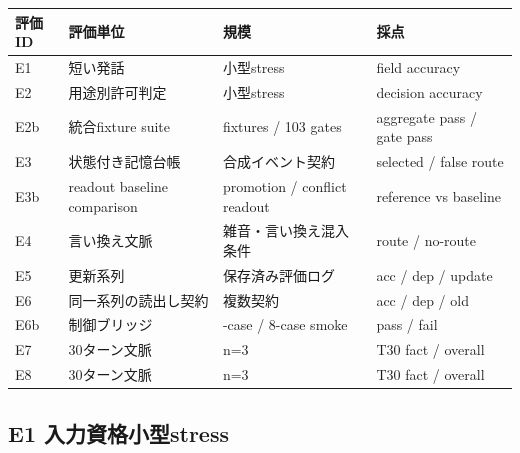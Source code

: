 \documentclass[12pt,a4paper]{article}
\begin{document}
{\def\LTcaptype{table} %
\begin{longtable}[]{@{}
  >{\raggedright\arraybackslash}p{}
  >{\raggedright\arraybackslash}p{}
  >{\raggedright\arraybackslash}p{}
  >{\raggedright\arraybackslash}p{}@{}}
\toprule\noalign{}
\begin{minipage}[b]{\linewidth}\raggedright
評価ID
\end{minipage} & \begin{minipage}[b]{\linewidth}\raggedright
評価単位
\end{minipage} & \begin{minipage}[b]{\linewidth}\raggedright
規模
\end{minipage} & \begin{minipage}[b]{\linewidth}\raggedright
採点
\end{minipage} \\
\midrule\noalign{}
\endhead
\bottomrule\noalign{}
\endlastfoot
E1 & 短い発話 & 小型stress & field accuracy \\
E2 & 用途別許可判定 & 小型stress & decision accuracy \\
E2b & 統合fixture suite & 1412 fixtures / 103 gates & aggregate pass / gate pass \\
E3 & 状態付き記憶台帳 & 合成イベント契約 & selected / false route \\
E3b & readout baseline comparison & promotion / conflict readout & reference vs baseline \\
E4 & 言い換え文脈 & 雑音・言い換え混入条件 & route / no-route \\
E5 & 更新系列 & 保存済み評価ログ & acc / dep / update \\
E6 & 同一系列の読出し契約 & 複数契約 & acc / dep / old \\
E6b & 制御ブリッジ & 20-case / 8-case smoke & pass / fail \\
E7 & 30ターン文脈 & n=3 & T30 fact / overall \\
E8 & 30ターン文脈 & n=3 & T30 fact / overall \\
\end{longtable}
}

\subsection{E1 入力資格小型stress}\label{e1-ux5165ux529bux8cc7ux683cux5c0fux578bstress}
\end{document}
